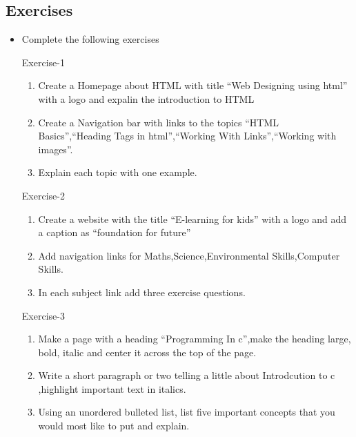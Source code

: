 \documentclass[11pt,a4paper]{article}
\begin{document}
\subsection*{Exercises}
\begin{itemize}
\item Complete the following  exercises
\item[Exercise-1]\
\begin{enumerate}[label=\bfseries Q\arabic*:]\itemsep10pt
\item Create a Homepage about HTML with title ``Web Designing using html'' with a logo and expalin the introduction to HTML 
\item Create a Navigation bar with links to the topics ``HTML Basics'',``Heading Tags in html'',``Working With Links'',``Working with images''.
\item Explain each topic with one example.
\end{enumerate}
\item[Exercise-2]\
\begin{enumerate}[label=\bfseries Q\arabic*:]\itemsep10pt
\item Create a website with the title ``E-learning for kids'' with a logo and add a caption as ``foundation for future'' 
\item Add navigation links for Maths,Science,Environmental Skills,Computer Skills.
\item In each subject link add three exercise questions.
\end{enumerate}
\item[Exercise-3]\
\begin{enumerate}[label=\bfseries Q\arabic*:]\itemsep10pt
\item Make a page with a heading ``Programming In c'',make the heading large, bold, italic and center it across the top of the page.
\item Write a short paragraph or two telling a little about Introdcution to c ,highlight important text in italics.
\item Using an unordered bulleted list, list five important concepts that you would most like to put and explain.
\end{enumerate}
\end{itemize}
\end{document}
